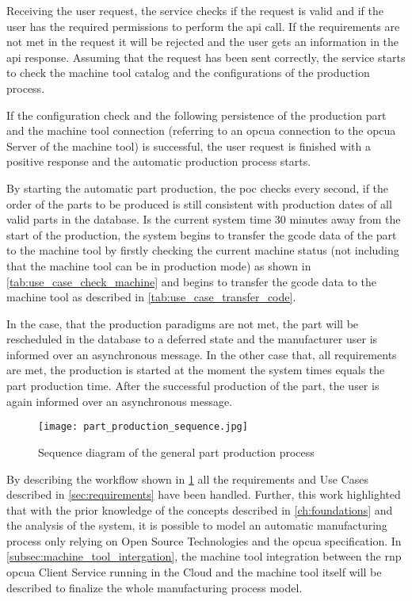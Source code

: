 \documentclass[
a4paper,
twoside,
headsepline,
cleardoublepage=empty,
parskip=half,
draft=false
]{scrbook}
\begin{document}
				Receiving the user request, the service checks if the request is valid and if the user has the required permissions to perform the \gls{api} call. If the requirements are not met in the request it will be rejected and the user gets an information in the \gls{api} response. Assuming that the request has been sent correctly, the service starts to check the machine tool catalog and the configurations of the production process.
				
				If the configuration check and the following persistence of the production part and the machine tool connection (referring to an \gls{opcua} connection to the \gls{opcua} Server of the machine tool) is successful, the user request is finished with a positive response and the automatic production process starts.
				
				By starting the automatic part production, the \gls{poc} checks every second, if the order of the parts to be produced is still consistent with production dates of all valid parts in the database. Is the current system time 30 minutes away from the start of the production, the system begins to transfer the \gls{gcode} data of the part to the machine tool by firstly checking the current machine status (not including that the machine tool can be in production mode) as shown in \cref{tab:use_case_check_machine} and begins to transfer the \gls{gcode} data to the machine tool as described in \cref{tab:use_case_transfer_code}.
				
				In the case, that the production paradigms are not met, the part will be rescheduled in the database to a deferred state and the manufacturer user is informed over an asynchronous message. In the other case that, all requirements are met, the production is started at the moment the system times equals the part production time. After the successful production of the part, the user is again informed over an asynchronous message.
				
				\begin{figure}[htbp]
					\centering
					\texttt{[image: part\_production\_sequence.jpg]}
					\caption{Sequence diagram of the general part production process}
					\label{fig:poc_workflow_diagram}
				\end{figure}
				
				By describing the workflow shown in \cref{fig:poc_workflow_diagram} all the requirements and Use Cases described in \cref{sec:requirements} have been handled. 
				Further, this work highlighted that with the prior knowledge of the concepts described in \cref{ch:foundations} and the analysis of the system, it is possible to model an automatic manufacturing process only relying on Open Source Technologies and the \gls{opcua} specification. 
				In \cref{subsec:machine_tool_intergation}, the machine tool integration between the \gls{rnp} \gls{opcua} Client Service running in the Cloud and the machine tool itself will be described to finalize the whole manufacturing process model.
				
\end{document}
